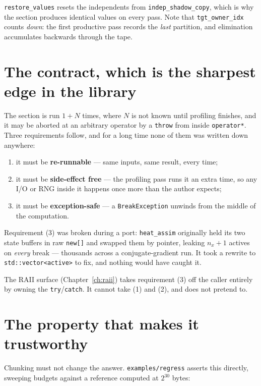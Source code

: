 \documentclass[11pt,a4paper]{report}
\newcommand{\code}[1]{\texttt{#1}}
\begin{document}
\code{restore\_values} resets the independents from \code{indep\_shadow\_copy},
which is why the section produces identical values on every pass. Note that
\code{tgt\_owner\_idx} counts \emph{down}: the first productive pass records the
\emph{last} partition, and elimination accumulates backwards through the tape.

\section{The contract, which is the sharpest edge in the library}
\label{sec:contract}

The section is run $1+N$ times, where $N$ is not known until profiling finishes,
and it may be aborted at an arbitrary operator by a \code{throw} from inside
\code{operator*}. Three requirements follow, and for a long time none of them
was written down anywhere:

\begin{enumerate}
\item it must be \textbf{re-runnable} --- same inputs, same result, every time;
\item it must be \textbf{side-effect free} --- the profiling pass runs it an
      extra time, so any I/O or RNG inside it happens once more than the author
      expects;
\item it must be \textbf{exception-safe} --- a \code{BreakException} unwinds
      from the middle of the computation.
\end{enumerate}

Requirement (3) was broken during a port: \code{heat\_assim} originally held its
two state buffers in raw \code{new[]} and swapped them by pointer, leaking
$n_x+1$ actives on \emph{every} break --- thousands across a conjugate-gradient
run. It took a rewrite to \code{std::vector<active>} to fix, and nothing would
have caught it.

The RAII surface (Chapter~\ref{ch:raii}) takes requirement (3) off the caller
entirely by owning the \code{try}/\code{catch}. It cannot take (1) and (2), and
does not pretend to.

\section{The property that makes it trustworthy}

Chunking must not change the answer. \code{examples/regress} asserts this
directly, sweeping budgets against a reference computed at $2^{30}$ bytes:
\end{document}
